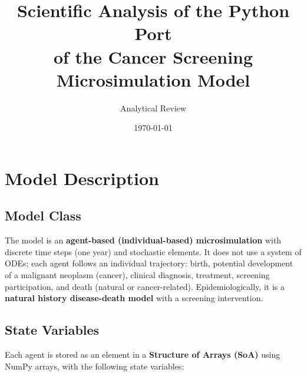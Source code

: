 \documentclass[12pt,a4paper]{article}
\title{Scientific Analysis of the Python Port\\of the Cancer Screening Microsimulation Model}
\author{Analytical Review}
\date{\today}
\begin{document}
\maketitle
\tableofcontents
\newpage

\section{Model Description}

\subsection{Model Class}
The model is an \textbf{agent-based (individual-based) microsimulation} with discrete time steps (one year) and stochastic elements. It does not use a system of ODEs; each agent follows an individual trajectory: birth, potential development of a malignant neoplasm (cancer), clinical diagnosis, treatment, screening participation, and death (natural or cancer-related). Epidemiologically, it is a \textbf{natural history disease-death model} with a screening intervention.

\subsection{State Variables}

Each agent is stored as an element in a \textbf{Structure of Arrays (SoA)} using NumPy arrays, with the following state variables:
\end{document}
